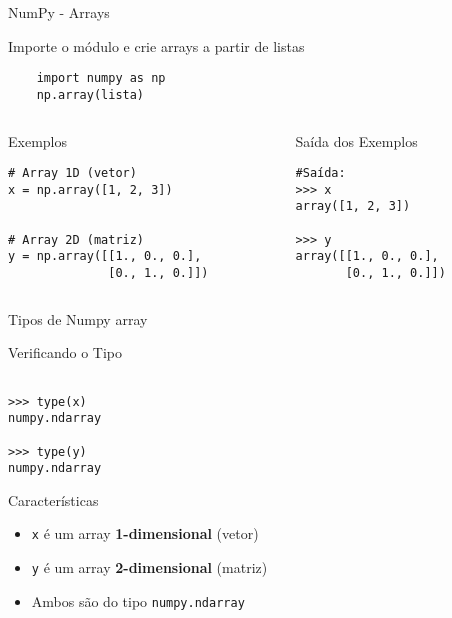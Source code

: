 \begin{frame}[fragile]{NumPy - Arrays}

\begin{block}{Importe o módulo e crie arrays a partir de listas}

    \begin{verbatim}
    import numpy as np
    np.array(lista)
    \end{verbatim}

\end{block}
\begin{columns}[T]
    \begin{column}{0.5\textwidth}
\begin{exampleblock}{Exemplos}
\begin{verbatim}
# Array 1D (vetor)
x = np.array([1, 2, 3])


# Array 2D (matriz)
y = np.array([[1., 0., 0.], 
              [0., 1., 0.]])

\end{verbatim}
\end{exampleblock}
    \end{column}
    
  \begin{column}{0.5\textwidth}  
  \begin{block}{Saída dos Exemplos}
        \begin{verbatim}
#Saída:
>>> x
array([1, 2, 3])

>>> y
array([[1., 0., 0.],
       [0., 1., 0.]])
 \end{verbatim}
        \end{block}
    \end{column}
\end{columns} 
\end{frame}

\begin{frame}{Tipos de Numpy array}

\begin{alertblock}{Verificando o Tipo}
        \begin{verbatim}

>>> type(x)
numpy.ndarray

>>> type(y)
numpy.ndarray
        \end{verbatim}
\end{alertblock}


\begin{block}{Características}
\begin{itemize}
    \item \texttt{x} é um array \textbf{1-dimensional} (vetor)
    \item \texttt{y} é um array \textbf{2-dimensional} (matriz)
    \item Ambos são do tipo \texttt{numpy.ndarray}
\end{itemize}
\end{block}
\end{frame}

